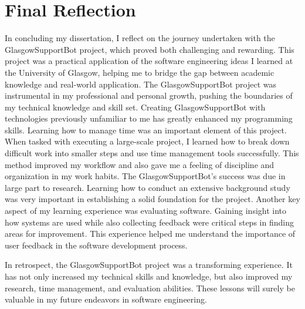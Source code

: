 \documentclass{l4proj}
\begin{document}
\section{Final Reflection}

In concluding my dissertation, I reflect on the journey undertaken with the GlasgowSupportBot project,  which proved both challenging and rewarding. This project was a practical application of the software engineering ideas I learned at the University of Glasgow, helping me to bridge the gap between academic knowledge and real-world application. The GlasgowSupportBot project was instrumental in my professional and personal growth, pushing the boundaries of my technical knowledge and skill set. Creating GlasgowSupportBot with technologies previously unfamiliar to me has greatly enhanced my programming skills. Learning how to manage time was an important element of this project. When tasked with executing a large-scale project, I learned how to break down difficult work into smaller steps and use time management tools successfully. This method improved my workflow and also gave me a feeling of discipline and organization in my work habits. The GlasgowSupportBot's success was due in large part to research. Learning how to conduct an extensive background study was very important in establishing a solid foundation for the project. Another key aspect of my learning experience was evaluating software. Gaining insight into how systems are used while also collecting feedback were critical steps in finding areas for improvement. This experience helped me understand the importance of user feedback in the software development process.

In retrospect, the GlasgowSupportBot project was a transforming experience. It has not only increased my technical skills and knowledge, but also improved my research, time management, and evaluation abilities. These lessons will surely be valuable in my future endeavors in software engineering.


\end{document}
